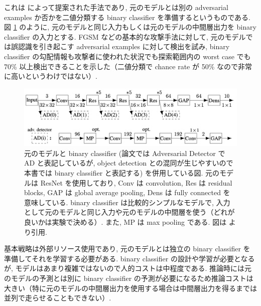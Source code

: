 これは \cite{metzen2017detecting} によって提案された手法であり, 元のモデルとは別の adversarial examples か否かを二値分類する binary classifier を準備するというものである.
図 \ref{fig:on-detecting-model} のように, 元のモデルと同じ入力もしくは元のモデルの中間層出力を binary classifier の入力とする.
FGSM などの基本的な攻撃手法に対して, 元のモデルでは誤認識を引き起こす adversarial examples に対して検出を試み, binary classifier の勾配情報も攻撃者に使われた状況でも探索範囲内の worst case でも 70\% 以上検出できることを示した（二値分類で chance rate が 50\% なので非常に高いというわけではない）.
%
\begin{figure}[htbp]
\begin{center}
\includegraphics[width=14.0cm]{figures/on-detecting-model.pdf}
\end{center}
\caption{
元のモデルと binary classifier (論文では Adversarial Detector で AD と表記しているが, object detection との混同が生じやすいので本書では binary classifier と表記する) を併用している図.
元のモデルは ResNet を使用しており, Conv は convolution, Res は residual blocks, GAP は global average pooling, Dens は fully connected を意味している.
binary classifier は比較的シンプルなモデルで, 入力として元のモデルと同じ入力や元のモデルの中間層を使う（どれが良いかは実験で決める）.
また, MP は max pooling である.
図は \cite{metzen2017detecting} より引用.
}
\label{fig:on-detecting-model}
\end{figure}

基本戦略は外部リソース使用であり, 元のモデルとは独立の binary classifier を準備してそれを学習する必要がある.
binary classifier の設計や学習が必要となるが, モデルはあまり複雑ではないので人的コストは中程度である.
推論時には元のモデルの予測とは別に binary classifier の予測が必要になるため推論コストは大きい（特に元のモデルの中間層出力を使用する場合は中間層出力を得るまでは並列で走らせることもできない）.

